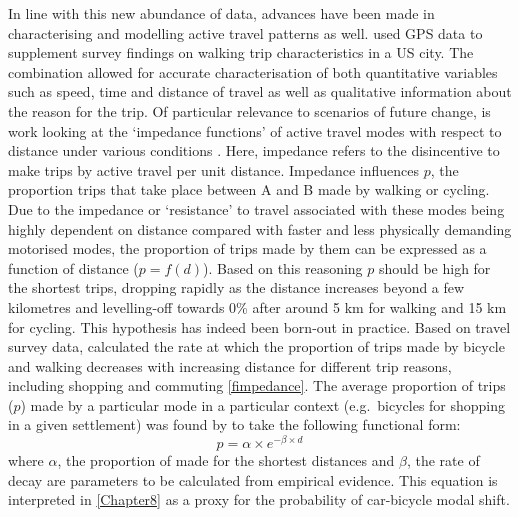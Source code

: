 \documentclass[a4paper, 11pt, twoside]{Thesis}
\begin{document}
In line with this new abundance of data, advances have been made in
characterising and 
modelling active travel patterns as well. \citet{Millward2013} used GPS
data to supplement survey findings on walking trip characteristics in a US
city. The combination allowed for accurate characterisation of both
quantitative variables such as speed, time and distance of travel as well
as qualitative information about the reason for the trip.
Of particular relevance to scenarios of
future change, is work looking at the `impedance functions' of active travel
modes with respect to distance under various conditions \citep{Iacono2010}.
Here, impedance refers to the disincentive to make trips by active travel per
unit distance.
Impedance influences $p$, the proportion trips that
take place between A and B made by walking or cycling. Due to the impedance or 
`resistance' to travel associated with these modes being highly dependent on distance
compared with faster and 
less physically demanding motorised modes, the proportion of trips made by them
can be expressed as a function of distance ($p = f(d)$). Based on this reasoning
$p$ should be high for the shortest
trips, dropping rapidly as the distance increases beyond a few kilometres
and levelling-off towards 0\%  after around 5 km for walking and 15 km for cycling. 
This hypothesis has indeed been born-out in practice.
Based on travel survey data, \citet{Iacono2010} calculated the rate
at which the proportion of trips made by bicycle and walking decreases
with increasing distance for different trip reasons, including shopping and
commuting \cref{fimpedance}.
The average proportion of trips ($p$) made by a particular mode in a particular context
(e.g.~bicycles for shopping in a given settlement) was found by \citet{Iacono2010}
to take the following functional form:
\begin{equation}
 p = \alpha \times e^{- \beta \times d}
 \label{eimpedance}
\end{equation}
where $\alpha$, the proportion of made for the shortest distances
and $\beta$, the rate of decay
are parameters to be calculated from empirical evidence. 
This equation is interpreted in \cref{Chapter8} as a proxy for the probability
of car-bicycle modal shift.
\end{document}
